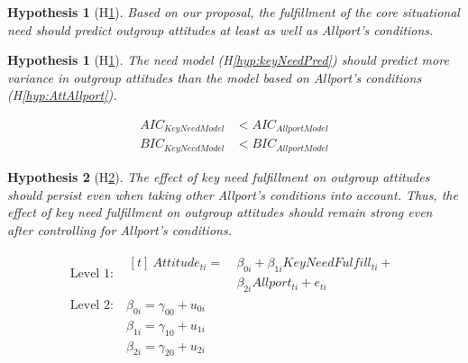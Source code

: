 \documentclass[man, 12pt, a4paper, mask]{apa7}
\theoremstyle{break}
\theoremstyle{plain}
\newtheorem{hyp}{Hypothesis}
\newtheorem{subhyp}{Hypothesis}
\begin{document}
\begin{mdframed}[style=mdfhypothesis]
    \begin{hyp}[H\ref{hyp:NeedAllport}] \label{hyp:NeedAllport}
    Based on our proposal, the fulfillment of the core situational need should predict outgroup attitudes at least as well as Allport's conditions.
    \end{hyp}

    \setcounter{subhyp}{0}
    \begin{subhyp}[H\ref{hyp:compModel}] \label{hyp:compModel}
    \addtolength{\leftskip}{\subhypskip}
    The need model (H\ref{hyp:keyNeedPred}) should predict more variance in outgroup attitudes than the model based on Allport's conditions (H\ref{hyp:AttAllport}).
    \end{subhyp}

    \begin{fleqn}[\eqskip] 
        \begin{equation}
            \begin{split}
                AIC_{KeyNeedModel} & < AIC_{AllportModel} \\
                BIC_{KeyNeedModel} & < BIC_{AllportModel}
            \end{split}
        \end{equation}
    \end{fleqn}

    \begin{subhyp}[H\ref{hyp:compTogether}] \label{hyp:compTogether}
    \addtolength{\leftskip}{\subhypskip}
    The  effect of key need fulfillment on outgroup attitudes should  persist even when taking other Allport's conditions into account. Thus, the effect of key need fulfillment on outgroup attitudes should remain strong even after controlling for Allport's conditions.  
    \end{subhyp} 

    \begin{fleqn}[\eqskip]
      \begin{equation} \label{eq:SlopesAttCoreAllport}
        \begin{split}
          \textrm{Level 1:} &
            \begin{aligned}[t]
              \ Attitude_{ti} =  &\ \beta_{0i} + \beta_{1i}KeyNeedFulfill_{ti} + \\
                                 &\ \beta_{2i}Allport_{ti} + e_{ti}
            \end{aligned} \\
          \textrm{Level 2:} &\ \beta_{0i} = \gamma_{00} + u_{0i} \\
                            &\ \beta_{1i} = \gamma_{10} + u_{1i} \\
                            &\ \beta_{2i} = \gamma_{20} + u_{2i}
        \end{split} 
      \end{equation}
    \end{fleqn}
\end{mdframed}
\end{document}
